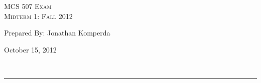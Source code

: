 \begin{center}
\textsc{\Large MCS 507 Exam\\}
\textsc{Midterm 1: Fall 2012}
\end{center}
\begin{minipage}{0.4\textwidth}
\begin{flushleft}
	Prepared By: Jonathan Komperda
\end{flushleft}
\end{minipage}
\begin{minipage}{0.59\textwidth}
\begin{flushright}
	October 15, 2012
\end{flushright}
\end{minipage}\\[0.01in]
\hrule